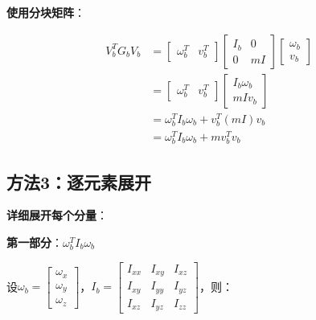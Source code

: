\documentclass[12pt,a4paper]{article}
\begin{document}
\textbf{使用分块矩阵}：

\begin{align}
V_b^T G_b V_b &= \begin{bmatrix} \omega_b^T & v_b^T \end{bmatrix} \begin{bmatrix} I_b & 0 \\ 0 & mI \end{bmatrix} \begin{bmatrix} \omega_b \\ v_b \end{bmatrix} \\
&= \begin{bmatrix} \omega_b^T & v_b^T \end{bmatrix} \begin{bmatrix} I_b \omega_b \\ mI v_b \end{bmatrix} \\
&= \omega_b^T I_b \omega_b + v_b^T (mI) v_b \\
&= \omega_b^T I_b \omega_b + m v_b^T v_b
\end{align}

\subsection{方法3：逐元素展开}

\textbf{详细展开每个分量}：

\textbf{第一部分}：$\omega_b^T I_b \omega_b$

设$\omega_b = \begin{bmatrix} \omega_x \\ \omega_y \\ \omega_z \end{bmatrix}$，$I_b = \begin{bmatrix}
I_{xx} & I_{xy} & I_{xz} \\
I_{xy} & I_{yy} & I_{yz} \\
I_{xz} & I_{yz} & I_{zz}
\end{bmatrix}$，则：
\end{document}
